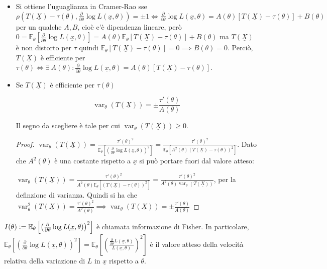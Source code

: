 \documentclass[hidelinks, 10pt]{report}
\DeclareMathOperator{\var}{var}
\begin{document}
\begin{oss}
\noindent
\begin{itemize}
\item Si ottiene l'uguaglianza in Cramer-Rao sse $ \rho \left( T(\underline{X}) - \tau(\theta), \frac{\partial}{\partial \theta} \log L(\underline{x}, \theta) \right) = \pm 1 \iff \frac{\partial}{\partial \theta} \log L(\underline{x}, \theta) = A(\theta) [T(\underline{X}) - \tau(\theta)] + B(\theta) $ per un qualche $ A, B $, cio\`e c'è dipendenza lineare, per\`o $ 0 = \mathbb{E}_{\theta} \left[ \frac{\partial}{\partial \theta} \log L(\underline{x}, \theta) \right] = A(\theta) \mathbb{E}_{\theta} [T(\underline{X}) - \tau(\theta)] + B(\theta) $ ma $ T(\underline{X}) $ \`e non distorto per $ \tau $ quindi $ \mathbb{E}_{\theta} [T(\underline{X}) - \tau(\theta)] = 0 \implies B(\theta) = 0 $. Perci\`o, $ T(\underline{X}) $ \`e efficiente per $ \tau(\theta) \iff \exists\ A(\theta) : \frac{\partial}{\partial \theta} \log L(\underline{x}, \theta) = A(\theta)[T(\underline{X}) - \tau(\theta)] $.
\item Se $ T(\underline{X}) $ \`e efficiente per $ \tau(\theta) $

\[ \var_{\theta} (T(\underline{X})) = \pm \frac{\tau'(\theta)}{A(\theta)} \]

Il segno da scegliere \`e tale per cui $ \var_{\theta} (T(\underline{X})) \ge 0 $.

\begin{proof}
$ \var_{\theta} (T(\underline{X})) = \frac{\tau'(\theta)^2}{\mathbb{E}_{\theta} \left[ \left( \frac{\partial}{\partial \theta} \log L(\underline{x}, \theta) \right)^2 \right]} = \frac{\tau'(\theta)^2}{\mathbb{E}_{\theta} \left[ A^2(\theta) \left( T(\underline{X}) - \tau(\theta) \right)^2 \right]} $. Dato che $ A^2(\theta) $ \`e una costante rispetto a $ \underline{x} $ si pu\`o portare fuori dal valore atteso:

$ \var_{\theta} (T(\underline{X})) = \frac{\tau'(\theta)^2}{A^2(\theta) \mathbb{E}_{\theta} \left[ \left( T(\underline{X}) - \tau(\theta) \right)^2 \right]} = \frac{\tau'(\theta)^2}{A^2(\theta) \var_{\theta} (T(\underline{X}))} $, per la definzione di varianza. Quindi si ha che $ \var^2_{\theta} (T(\underline{X})) = \frac{\tau'(\theta)^2}{A^2 (\theta)} \implies \var_{\theta} (T(\underline{X})) = \pm \frac{\tau'(\theta)}{A(\theta)} $
\end{proof}
\end{itemize}
\end{oss}

\begin{defn}
$ I(\theta) \vcentcolon= \mathbb{E}_{\theta} \left[ \left( \frac{\partial}{\partial \theta} \log L(\underline{x}, \theta) \right)^2 \right] $ \`e chiamata informazione di Fisher. In particolare, $ \mathbb{E}_{\theta} \left[ \left( \frac{\partial}{\partial \theta} \log L(\underline{x}, \theta) \right)^2 \right] = \mathbb{E}_{\theta} \left[ \left( \frac{\frac{\partial}{\partial \theta} L(\underline{x}, \theta)}{L(\underline{x}, \theta)} \right)^2 \right] $ \`e il valore atteso della velocit\`a relativa della variazione di $ L $ in $ \underline{x} $ rispetto a $ \theta $.
\end{defn}
\end{document}
